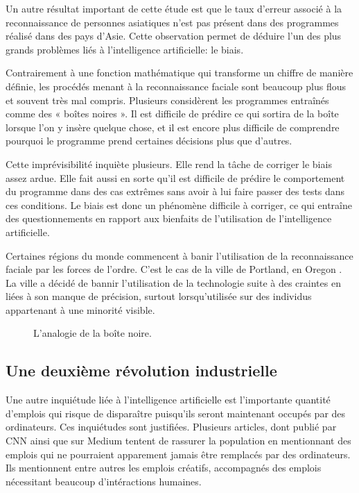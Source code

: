 \documentclass[letterpaper,10pt,french]{sphinxmanual}
\begin{document}
Un autre résultat important de cette étude est que le taux d’erreur associé à la
reconnaissance de personnes asiatiques n’est pas présent dans des programmes
réalisé dans des pays d’Asie. Cette observation permet de déduire l’un des plus
grands problèmes liés à l’intelligence artificielle: le biais.

Contrairement à une fonction mathématique qui transforme un chiffre de manière
définie, les procédés menant à la reconnaissance faciale sont beaucoup plus
flous et souvent très mal compris. Plusieurs considèrent les programmes
entraînés comme des « boîtes noires ». Il est difficile de prédire ce qui sortira
de la boîte lorsque l’on y insère quelque chose, et il est encore plus difficile
de comprendre pourquoi le programme prend certaines décisions plus que d’autres.

Cette imprévisibilité inquiète plusieurs. Elle rend la tâche de corriger le
biais assez ardue. Elle fait aussi en sorte qu’il est difficile de prédire le
comportement du programme dans des cas extrêmes sans avoir à lui faire passer
des tests dans ces conditions. Le biais est donc un phénomène difficile à
corriger, ce qui entraîne des questionnements en rapport aux bienfaits de
l’utilisation de l’intelligence artificielle.

Certaines régions du monde
commencent à banir l’utilisation de la reconnaissance faciale par les forces
de l’ordre. C’est le cas de la ville de Portland, en Oregon .
La ville a décidé de bannir l’utilisation de la technologie suite à des craintes
en liées à son manque de précision, surtout lorsqu’utilisée sur des individus
appartenant à une minorité visible.

\begin{figure}[htbp]
\centering
\capstart

\noindent{}
\caption{L’analogie de la boîte noire.}\label{\detokenize{enonce_sujet:boite-noire}}\end{figure}


\subsection{Une deuxième révolution industrielle}
\label{\detokenize{enonce_sujet:une-deuxieme-revolution-industrielle}}
Une autre inquiétude liée à l’intelligence artificielle est l’importante
quantité d’emplois qui risque de disparaître puisqu’ils seront maintenant
occupés par des ordinateurs. Ces inquiétudes sont justifiées. Plusieurs articles,
dont
publié par CNN ainsi que
sur Medium tentent de rassurer la population en mentionnant des emplois qui ne
pourraient apparement jamais être remplacés par des ordinateurs. Ils mentionnent
entre autres les emplois créatifs, accompagnés des emplois nécessitant beaucoup
d’intéractions humaines.
\end{document}
